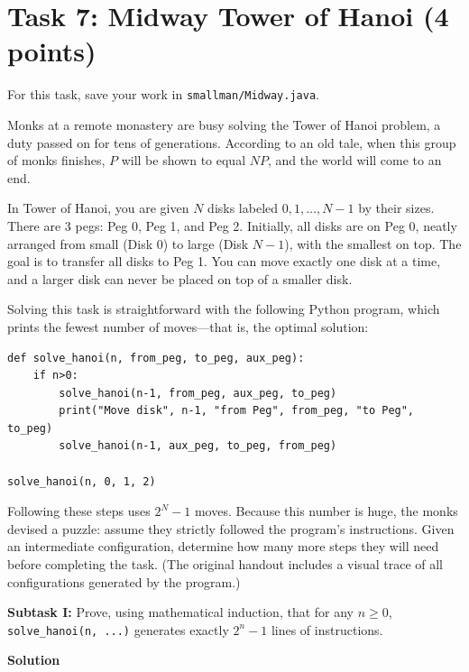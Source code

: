 \documentclass{article}
\newcommand{\solution}{\textbf{\large Solution}}
\theoremstyle{remark}
\begin{document}
\vspace{1em}
\hrulefill

\section*{Task 7: Midway Tower of Hanoi (4 points)}
For this task, save your work in \texttt{smallman/Midway.java}. 

Monks at a remote monastery are busy solving the Tower of Hanoi problem, a duty passed on for tens of generations. According to an old tale, when this group of monks finishes, $P$ will be shown to equal $NP$, and the world will come to an end.

In Tower of Hanoi, you are given $N$ disks labeled $0, 1, \ldots, N-1$ by their sizes. There are 3 pegs: Peg 0, Peg 1, and Peg 2. Initially, all disks are on Peg 0, neatly arranged from small (Disk 0) to large (Disk $N-1$), with the smallest on top. The goal is to transfer all disks to Peg 1. You can move exactly one disk at a time, and a larger disk can never be placed on top of a smaller disk.

Solving this task is straightforward with the following Python program, which prints the fewest number of moves---that is, the optimal solution:
\begin{verbatim}
def solve_hanoi(n, from_peg, to_peg, aux_peg):
    if n>0:
        solve_hanoi(n-1, from_peg, aux_peg, to_peg)
        print("Move disk", n-1, "from Peg", from_peg, "to Peg", to_peg)
        solve_hanoi(n-1, aux_peg, to_peg, from_peg)

solve_hanoi(n, 0, 1, 2)
\end{verbatim}
Following these steps uses $2^N - 1$ moves. Because this number is huge, the monks devised a puzzle: assume they strictly followed the program's instructions. Given an intermediate configuration, determine how many more steps they will need before completing the task. (The original handout includes a visual trace of all configurations generated by the program.)

\textbf{Subtask I:} Prove, using mathematical induction, that for any $n \ge 0$, \texttt{solve\_hanoi(n, ...)} generates exactly $2^n - 1$ lines of instructions.

\medskip
\solution
\end{document}
